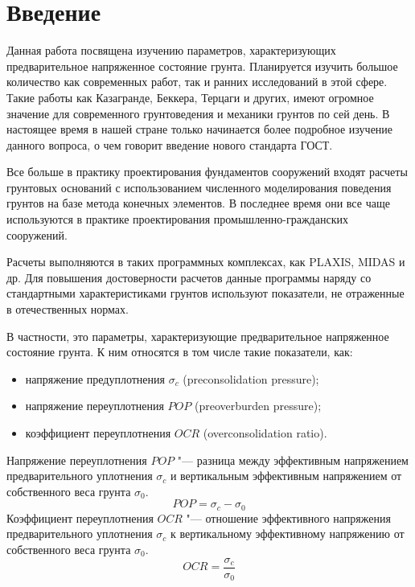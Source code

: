 \chapter*{Введение}                         %

Данная работа посвящена изучению параметров, характеризующих предварительное напряженное состояние грунта. Планируется изучить большое количество как современных работ, так и ранних исследований в этой сфере. Такие работы как Казагранде, Беккера, Терцаги и других, имеют огромное значение для современного грунтоведения и механики грунтов по сей день.
В настоящее время в нашей стране только начинается более подробное изучение данного вопроса, о чем говорит введение нового стандарта ГОСТ. 

Все больше в практику проектирования фундаментов сооружений входят расчеты грунтовых оснований с использованием численного моделирования поведения грунтов на базе метода конечных элементов. 
В последнее время они все чаще используются в практике проектирования промышленно-гражданских сооружений. 

Расчеты выполняются в таких программных комплексах, как PLAXIS, MIDAS и др. 
Для повышения достоверности расчетов данные программы наряду со стандартными характеристиками грунтов используют показатели, не отраженные в отечественных нормах. 

В частности, это параметры, характеризующие предварительное напряженное состояние грунта. 
К ним относятся в том числе такие показатели, как:
\begin{itemize}
    \item напряжение предуплотнения $\sigma_c$ (preconsolidation pressure);
    \item напряжение переуплотнения $POP$ (preoverburden pressure);
    \item коэффициент переуплотнения $OCR$ (overconsolidation ratio).
\end{itemize}

Напряжение переуплотнения $POP$ "--- разница между эффективным напряжением предвари­тельного уплотнения $\sigma_c$ и вертикальным эффективным напряжением от собственного веса грунта $\sigma_0$.
\begin{equation}
    \label{eq:pop}
    POP = \sigma_c - \sigma_0
\end{equation}
Коэффициент переуплотнения $OCR$ "---  отношение эффективного напряжения предваритель­ного уплотнения $\sigma_c$ к вертикальному эффективному напряжению от собственного веса грунта $\sigma_0$.
\begin{equation}
    \label{eq:ocr}
    OCR = \frac{\sigma_c}{\sigma_0}
\end{equation}

